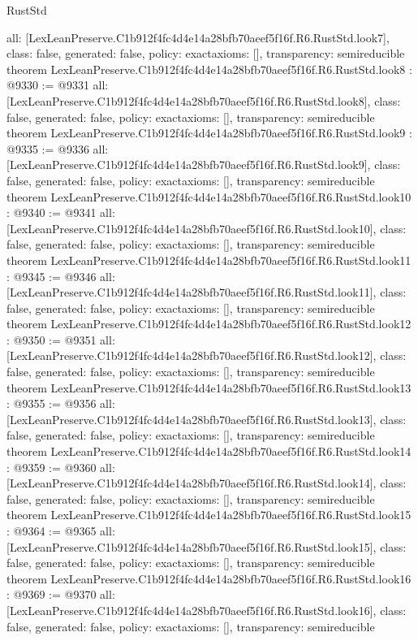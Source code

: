 \begin{lexlean}{RustStd}
\begin{coremodule}
{  all: [LexLeanPreserve.C1b912f4fc4d4e14a28bfb70aeef5f16f.R6.RustStd.look7],
  class: false,
  generated: false,
  policy: exact{axioms: []},
  transparency: semireducible
}
theorem LexLeanPreserve.C1b912f4fc4d4e14a28bfb70aeef5f16f.R6.RustStd.look8 : @9330 := @9331 {
  all: [LexLeanPreserve.C1b912f4fc4d4e14a28bfb70aeef5f16f.R6.RustStd.look8],
  class: false,
  generated: false,
  policy: exact{axioms: []},
  transparency: semireducible
}
theorem LexLeanPreserve.C1b912f4fc4d4e14a28bfb70aeef5f16f.R6.RustStd.look9 : @9335 := @9336 {
  all: [LexLeanPreserve.C1b912f4fc4d4e14a28bfb70aeef5f16f.R6.RustStd.look9],
  class: false,
  generated: false,
  policy: exact{axioms: []},
  transparency: semireducible
}
theorem LexLeanPreserve.C1b912f4fc4d4e14a28bfb70aeef5f16f.R6.RustStd.look10 : @9340 := @9341 {
  all: [LexLeanPreserve.C1b912f4fc4d4e14a28bfb70aeef5f16f.R6.RustStd.look10],
  class: false,
  generated: false,
  policy: exact{axioms: []},
  transparency: semireducible
}
theorem LexLeanPreserve.C1b912f4fc4d4e14a28bfb70aeef5f16f.R6.RustStd.look11 : @9345 := @9346 {
  all: [LexLeanPreserve.C1b912f4fc4d4e14a28bfb70aeef5f16f.R6.RustStd.look11],
  class: false,
  generated: false,
  policy: exact{axioms: []},
  transparency: semireducible
}
theorem LexLeanPreserve.C1b912f4fc4d4e14a28bfb70aeef5f16f.R6.RustStd.look12 : @9350 := @9351 {
  all: [LexLeanPreserve.C1b912f4fc4d4e14a28bfb70aeef5f16f.R6.RustStd.look12],
  class: false,
  generated: false,
  policy: exact{axioms: []},
  transparency: semireducible
}
theorem LexLeanPreserve.C1b912f4fc4d4e14a28bfb70aeef5f16f.R6.RustStd.look13 : @9355 := @9356 {
  all: [LexLeanPreserve.C1b912f4fc4d4e14a28bfb70aeef5f16f.R6.RustStd.look13],
  class: false,
  generated: false,
  policy: exact{axioms: []},
  transparency: semireducible
}
theorem LexLeanPreserve.C1b912f4fc4d4e14a28bfb70aeef5f16f.R6.RustStd.look14 : @9359 := @9360 {
  all: [LexLeanPreserve.C1b912f4fc4d4e14a28bfb70aeef5f16f.R6.RustStd.look14],
  class: false,
  generated: false,
  policy: exact{axioms: []},
  transparency: semireducible
}
theorem LexLeanPreserve.C1b912f4fc4d4e14a28bfb70aeef5f16f.R6.RustStd.look15 : @9364 := @9365 {
  all: [LexLeanPreserve.C1b912f4fc4d4e14a28bfb70aeef5f16f.R6.RustStd.look15],
  class: false,
  generated: false,
  policy: exact{axioms: []},
  transparency: semireducible
}
theorem LexLeanPreserve.C1b912f4fc4d4e14a28bfb70aeef5f16f.R6.RustStd.look16 : @9369 := @9370 {
  all: [LexLeanPreserve.C1b912f4fc4d4e14a28bfb70aeef5f16f.R6.RustStd.look16],
  class: false,
  generated: false,
  policy: exact{axioms: []},
  transparency: semireducible
}

\end{coremodule}
\end{lexlean}

